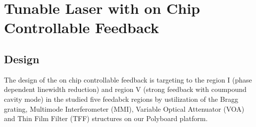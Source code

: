 \chapter{Tunable Laser with on Chip Controllable Feedback}\label{ch:laser_with_on_chip_feedback}
\section{Design}\label{sec:design}
The design of the on chip controllable feedback is targeting to the region I (phase dependent linewidth reduction) and region V (strong feedback with coumpound cavity mode) in the studied five feedabck regions \cite{} by ustilization of the Bragg grating, Multimode Interferometer (MMI), Variable Optical Attenuator (VOA) and Thin Film Filter (TFF) structures on our Polyboard platform. 


